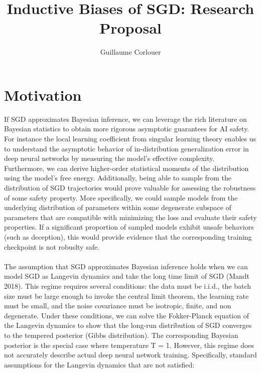 \documentclass[11pt]{article}
\title{Inductive Biases of SGD: Research Proposal}
\author{Guillaume Corlouer}
\begin{document}
\maketitle

\section*{Motivation}
If SGD approximates Bayesian inference, we can leverage the rich literature on Bayesian statistics to obtain more rigorous asymptotic guarantees for AI safety. For instance the local learning coefficient from singular learning theory enables us to understand the asymptotic behavior of in-distribution generalization error in deep neural networks by measuring the model's effective complexity. Furthermore, we can derive higher-order statistical moments of the distribution using the model's free energy. Additionally, being able to sample from the distribution of SGD trajectories would prove valuable for assessing the robustness of some safety property. More specifically, we could sample models from the underlying distribution of parameters within some degenerate subspace of parameters that are compatible with minimizing the loss and evaluate their safety properties. If a significant proportion of sampled models exhibit unsafe behaviors (such as deception), this would provide evidence that the corresponding training checkpoint is not robuslty safe.
\\
\\
The assumption that SGD approximates Bayesian inference holds when we can model SGD as Langevin dynamics and take the long time limit of SGD (Mandt 2018). This regime requires several conditions: the data must be i.i.d., the batch size must be large enough to invoke the central limit theorem, the learning rate must be small, and the noise covariance must be isotropic, finite, and non degenerate. Under these conditions, we can solve the Fokker-Planck equation of the Langevin dynamics to show that the long-run distribution of SGD converges to the tempered posterior (Gibbs distribution). The corresponding Bayesian posterior is the special case where temperature T = 1. However, this regime does not accurately describe actual deep neural network training. Specifically, standard assumptions for the Langevin dynamics that are not satisfied:
\end{document}
